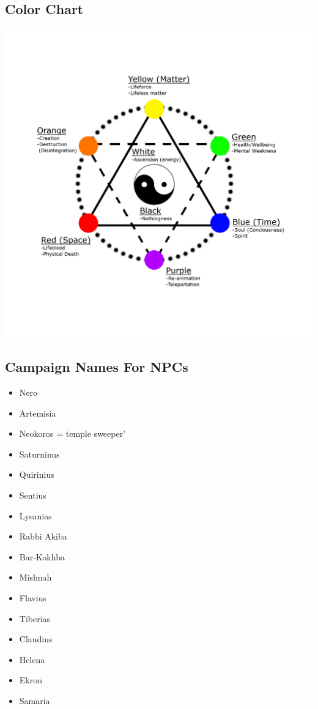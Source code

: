\subsection{Color Chart}

\includegraphics[width=\linewidth]{img/ColorChart.png}

\subsection{Campaign Names For NPCs}

\begin{multicols}{3}
	\begin{itemize}
		\item Nero
		\item Artemisia
		\item Neokoros = temple sweeper'
		\item Saturninus
		\item Quirinius
		\item Sentius
		\item Lysanias
		\item Rabbi Akiba
		\item Bar-Kokhba
		\item Mishnah
		\item Flavius
		\item Tiberias
		\item Claudius
		\item Helena
		\item Ekron
		\item Samaria
	\end{itemize}
\end{multicols}